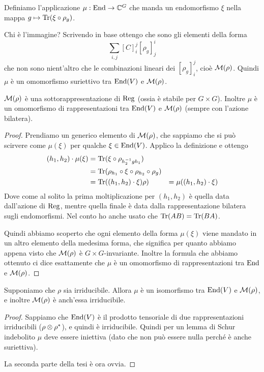 	Definiamo l'applicazione $\mu: \operatorname{End} \rightarrow \mathbb C^{G}$ che manda un endomorfismo $\xi$ nella mappa $g\mapsto \operatorname{Tr}(\xi\circ\rho_g)$.

	Chi è l'immagine? Scrivendo in base ottengo che sono gli elementi della forma
	\[
		\sum_{i,j} [C]_i^j[\rho_g]_j^i
	\]
	che non sono nient'altro che le combinazioni lineari dei $[\rho_g]_i^j$, cioè $\mathcal M(\rho)$. Quindi $\mu$ è un omomorfismo suriettivo tra $\operatorname{End}(V)$ e $\mathcal M(\rho)$.
	
	\begin{myprop}
		$\mathcal M(\rho)$ è una sottorappresentazione di $\operatorname{Reg}$ (ossia è stabile per $G\times G$). Inoltre $\mu$ è un omomorfismo di rappresentazioni tra $\operatorname{End} (V)$ e $\mathcal M(\rho)$ (sempre con l'azione bilatera).		 
	\end{myprop}

	\begin{proof}
		Prendiamo un generico elemento di $\mathcal M(\rho)$, che sappiamo che si può scirvere come $\mu(\xi)$ per qualche $\xi\in\operatorname{End}(V)$. Applico la definizione e ottengo
		\begin{align*}
			(h_1,h_2)\cdot \mu (\xi) &= \operatorname{Tr}(\xi \circ \rho_{h_2^{-1} gh_1})\\
															&= \operatorname{Tr}(\rho_{h_1} \circ \xi \circ \rho_{h_2} \circ \rho_g)\\
															&= \operatorname{Tr}((h_1,h_2)\cdot \xi)\rho)
															&= \mu((h_1,h_2)\cdot \xi)
		\end{align*}
		Dove come al solito la prima moltiplicazione per $(h_1,h_2)$ è quella data dall'azione di $\operatorname{Reg}$, mentre quella finale è data dalla rappresentazione bilatera sugli endomorfismi. Nel conto ho anche usato che $\operatorname{Tr}(AB)=\operatorname{Tr}(BA)$.
		
		Quindi abbiamo scoperto che ogni elemento della forma $\mu(\xi)$ viene mandato in un altro elemento della medesima forma, che significa per quanto abbiamo appena visto che $\mathcal M(\rho)$ è $G\times G$-invariante. Inoltre la formula che abbiamo ottenuto ci dice esattamente che $\mu$ è un omomorfismo di rappresentazioni tra $\operatorname{End}$ e $\mathcal M(\rho)$.
	\end{proof}
	
	\begin{mycor}
		Supponiamo che $\rho$ sia irriducibile. Allora $\mu$ è un isomorfismo tra $\operatorname{End}(V)$ e $\mathcal M(\rho)$, e inoltre $\mathcal M(\rho)$ è anch'essa irriducibile. 
	\end{mycor}
	\begin{proof}
		Sappiamo che $\operatorname{End} (V)$ è il prodotto tensoriale di due rappresentazioni irriducibili ($\rho \otimes \rho^*$), e quindi è irriducibile. Quindi per un lemma di Schur indebolito $\mu$ deve essere iniettiva (dato che non può essere nulla perché è anche suriettiva).
		
		La seconda parte della tesi è ora ovvia.
	\end{proof}
	
